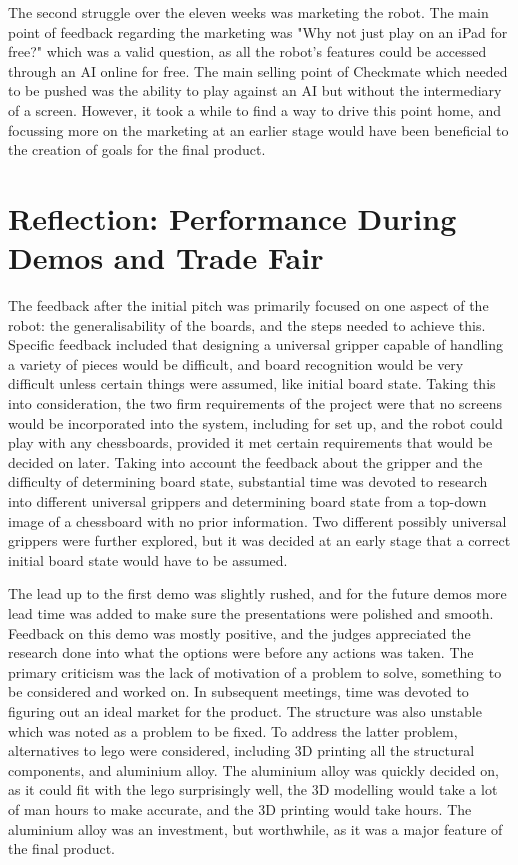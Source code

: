 \documentclass[onecolumn]{IEEEtran}
\begin{document}
The second struggle over the eleven weeks was marketing the robot. The main point of feedback regarding the marketing was "Why not just play on an iPad for free?" which was a valid question, as all the robot's features could be accessed through an AI online for free. The main selling point of Checkmate which needed to be pushed was the ability to play against an AI but without the intermediary of a screen. However, it took a while to find a way to drive this point home, and focussing more on the marketing at an earlier stage would have been beneficial to the creation of goals for the final product. \\


\section{Reflection: Performance During Demos and Trade Fair}
The feedback after the initial pitch was primarily focused on one aspect of the robot: the generalisability of the boards, and the steps needed to achieve this. Specific feedback included that designing a universal gripper capable of handling a variety of pieces would be difficult, and board recognition would be very difficult unless certain things were assumed, like initial board state. Taking this into consideration, the two firm requirements of the project were that no screens would be incorporated into the system, including for set up, and the robot could play with any chessboards, provided it met certain requirements that would be decided on later. Taking into account the feedback about the gripper and the difficulty of determining board state, substantial time was devoted to research into different universal grippers and determining board state from a top-down image of a chessboard with no prior information. Two different possibly universal grippers were further explored, but it was decided at an early stage that a correct initial board state would have to be assumed. \par
The lead up to the first demo was slightly rushed, and for the future demos more lead time was added to make sure the presentations were polished and smooth. Feedback on this demo was mostly positive, and the judges appreciated the research done into what the options were before any actions was taken. The primary criticism was the lack of motivation of a problem to solve, something to be considered and worked on. In subsequent meetings, time was devoted to figuring out an ideal market for the product. The structure was also unstable which was noted as a problem to be fixed. To address the latter problem, alternatives to lego were considered, including 3D printing all the structural components, and aluminium alloy. The aluminium alloy was quickly decided on, as it could fit with the lego surprisingly well, the 3D modelling would take a lot of man hours to make accurate, and the 3D printing would take hours. The aluminium alloy was an investment, but worthwhile, as it was a major feature of the final product. \par
\end{document}
